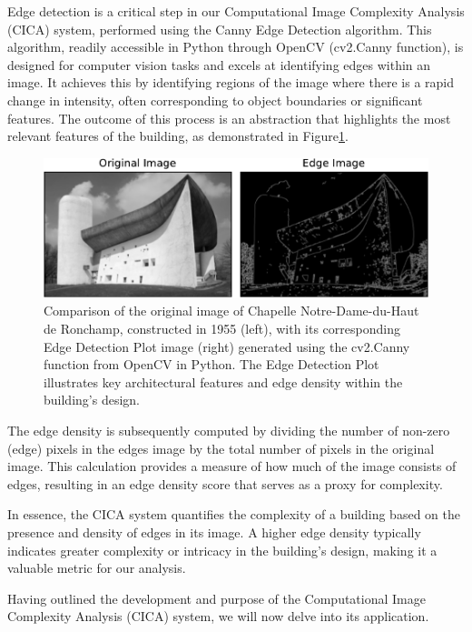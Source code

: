 Edge detection is a critical step in our Computational Image Complexity Analysis (CICA) system, performed using the Canny Edge Detection algorithm\cite{OpenCV2023}.
This algorithm, readily accessible in Python through OpenCV (cv2.Canny function), is designed for computer vision tasks and excels at identifying edges within an image.
It achieves this by identifying regions of the image where there is a rapid change in intensity, often corresponding to object boundaries or significant features.
The outcome of this process is an abstraction that highlights the most relevant features of the building, as demonstrated in Figure\ref{fig:CannyEdgePlotHistory}.

     \begin{figure}[htb]
          \centering
          \includegraphics[width= \linewidth]{Images/CannyEdgePlotHistory}
          \caption{Comparison of the original image of Chapelle Notre-Dame-du-Haut de Ronchamp, constructed in 1955 (left), with its corresponding Edge Detection Plot image (right) generated using the cv2.Canny function from OpenCV in Python. The Edge Detection Plot illustrates key architectural features and edge density within the building's design.}
          \label{fig:CannyEdgePlotHistory}
        \end{figure}

The edge density is subsequently computed by dividing the number of non-zero (edge) pixels in the edges image by the total number of pixels in the original image.
This calculation provides a measure of how much of the image consists of edges, resulting in an edge density score that serves as a proxy for complexity.

In essence, the CICA system quantifies the complexity of a building based on the presence and density of edges in its image.
A higher edge density typically indicates greater complexity or intricacy in the building's design, making it a valuable metric for our analysis.

Having outlined the development and purpose of the Computational Image Complexity Analysis (CICA) system, we will now delve into its application.


